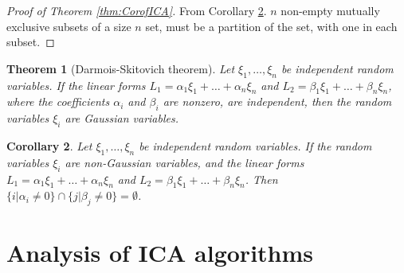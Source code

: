\documentclass[english]{article} %
\providecommand{\theoremname}{Theorem}
\providecommand{\corollaryname}{Corollary}
\theoremstyle{plain}
\newtheorem{thm}{\protect\theoremname}
\newtheorem{cor}[thm]{\protect\corollaryname}
\theoremstyle{definition}
\theoremstyle{remark}
\begin{document}
\begin{proof}[Proof of Theorem \ref{thm:CorofICA}]
From Corollary \ref{cor:DSTheoremCor}. $n$ non-empty mutually exclusive subsets of a size $n$ set, must be a partition of the set, with one in each subset.
\end{proof}
\begin{thm}[Darmois-Skitovich theorem]
Let $\xi_1,\ldots,\xi_n$ be independent random variables. If the linear forms $L_1 = \alpha_1\xi_1 + \ldots + \alpha_n\xi_n$ and $L_2 = \beta_1\xi_1 +\ldots + \beta_n\xi_n$, where the coefficients $\alpha_i$ and $\beta_i$ are nonzero, are independent, then the random variables $\xi_i$ are Gaussian variables.
\end{thm}

\begin{cor}
\label{cor:DSTheoremCor}
Let $\xi_1,\ldots,\xi_n$ be independent random variables. If the random variables $\xi_i$ are non-Gaussian variables, and the linear forms $L_1 = \alpha_1\xi_1 + \ldots + \alpha_n\xi_n$ and $L_2 = \beta_1\xi_1 +\ldots + \beta_n\xi_n$.  Then $\{i\vert \alpha_i \neq0\} \cap \{j\vert \beta_j \neq0\} = \emptyset$.
\end{cor}


\section{Analysis of ICA algorithms}
\end{document}
